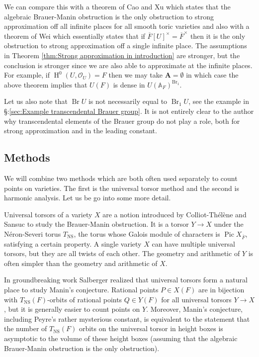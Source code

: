 \documentclass[a4paper,11pt,reqno]{amsart}
\newcommand{\A}{\mathbb{A}}
\DeclareMathOperator{\Pic}{Pic}
\DeclareMathOperator{\NS}{NS}
\DeclareMathOperator{\Br}{Br}
\DeclareMathOperator{\HH}{H}
\theoremstyle{definition}
\begin{document}
We can compare this with a theorem of Cao and Xu \cite{Cao2018Strong} which states that the algebraic Brauer-Manin obstruction is the only obstruction to strong approximation off all infinite places for all smooth toric varieties and also with a theorem of Wei \cite{Wei2021Strong} which essentially states that if $\overline{F}[U]^{\times} = \overline{F}^{\times}$ then it is the only obstruction to strong approximation off a single infinite place. The assumptions in Theorem \ref{thm:Strong approximation in introduction} are stronger, but the conclusion is stronger since we are also able to approximate at the infinite places. For example, if $\HH^0(U, \mathcal{O}_U) = F$ then we may take $\mathbf{A} = \emptyset$ in which case the above theorem implies that $U(F)$ is dense in $U(\A_F)^{\Br_1}$.

Let us also note that $\Br U$ is not necessarily equal to $\Br_1 U$, see the example in \S:\ref{sec:Example transcendental Brauer group}. It is not entirely clear to the author why transcendental elements of the Brauer group do not play a role, both for strong approximation and in the leading constant.
\subsection{Methods}
We will combine two methods which are both often used separately to count points on varieties. The first is the universal torsor method and the second is harmonic analysis. Let us be go into some more detail.

Universal torsors of a variety $X$ are a notion introduced by Colliot-Th\'elène and Sansuc \cite{Colliot1987Descente} to study the Brauer-Manin obstruction. It is a torsor $Y \to X$ under the N\'eron-Severi torus $T_{\NS}$, the torus whose Galois module of characters is $\Pic X_{\overline{F}}$, satisfying a certain property. A single variety $X$ can have multiple universal torsors, but they are all twists of each other. The geometry and arithmetic of $Y$ is often simpler than the geometry and arithmetic of $X$.

In groundbreaking work \cite{Salberger1998Tamagawa} Salberger realized that universal torsors form a natural place to study Manin's conjecture. Rational points $P \in X(F)$ are in bijection with $T_{\NS}(F)$-orbits of rational points $Q \in Y(F)$ for all universal torsors $Y \to X$, but it is generally easier to count points on $Y$. Moreover, Manin's conjecture, including Peyre's rather mysterious constant, is equivalent to the statement that the number of $T_{\NS}(F)$ orbits on the universal torsor in height boxes is asymptotic to the volume of these height boxes (assuming that the algebraic Brauer-Manin obstruction is the only obstruction).
\end{document}
